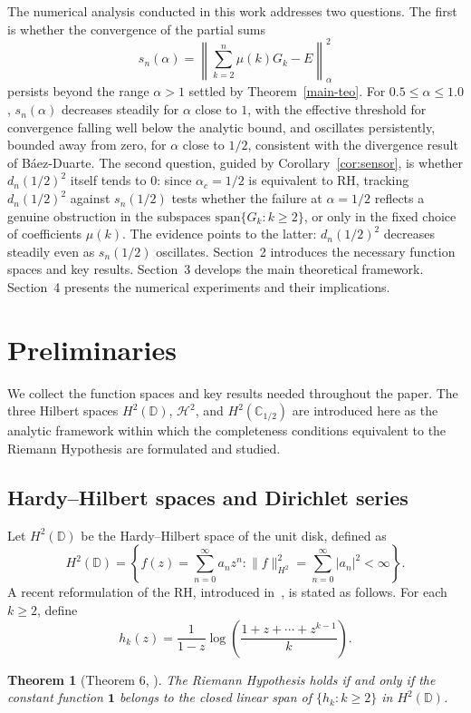 \documentclass[11pt]{extarticle}
\numberwithin{equation}{section}
\theoremstyle{plain}
\newtheorem{theorem}{Theorem}[section]
\theoremstyle{definition}
\begin{document}
The numerical analysis conducted in this work addresses two questions. The
first is whether the convergence of the partial sums
\[
s_n(\alpha) = \left\|\sum_{k=2}^{n}\mu(k)G_k - E\right\|^2_\alpha
\]
persists beyond the range $\alpha > 1$ settled by Theorem~\ref{main-teo}. For
$0.5 \leq \alpha \leq 1.0$, $s_n(\alpha)$ decreases steadily for $\alpha$ close
to $1$, with the effective threshold for convergence falling well below the
analytic bound, and oscillates persistently, bounded away from zero, for
$\alpha$ close to $1/2$, consistent with the divergence result of Báez-Duarte.
The second question, guided by Corollary~\ref{cor:sensor}, is whether
$d_n(1/2)^2$ itself tends to $0$: since $\alpha_c = 1/2$ is equivalent to RH,
tracking $d_n(1/2)^2$ against $s_n(1/2)$ tests whether the failure at
$\alpha = 1/2$ reflects a genuine obstruction in the subspaces
$\mathrm{span}\{G_k : k \geq 2\}$, or only in the fixed choice of coefficients
$\mu(k)$. The evidence points to the latter: $d_n(1/2)^2$ decreases steadily
even as $s_n(1/2)$ oscillates. Section~2
introduces the necessary function spaces and key results. Section~3 develops the main theoretical framework. Section~4
presents the numerical experiments and their implications.

\section{Preliminaries}

We collect the function spaces and key results needed throughout the paper. The three Hilbert spaces $H^2(\mathbb{D})$, $\mathcal{H}^2$, and $H^2(\mathbb{C}_{1/2})$ are introduced here as the analytic framework within which the completeness conditions equivalent to the Riemann Hypothesis are formulated and studied.

\subsection{Hardy--Hilbert spaces and Dirichlet series}

Let $H^2(\mathbb{D})$ be the Hardy--Hilbert space of the unit disk, defined as
\[
H^2(\mathbb{D}) = \left\{ f(z) = \sum_{n=0}^{\infty} a_n z^n : \|f\|_{H^2}^2 = \sum_{n=0}^{\infty} |a_n|^2 < \infty \right\}.
\]
A recent reformulation of the RH, introduced in~\cite{waleed1}, is stated as follows. For each $k \geq 2$, define
\[
h_k(z) = \frac{1}{1-z} \log\!\left(\frac{1 + z + \cdots + z^{k-1}}{k}\right).
\]

\begin{theorem}[Theorem 6, \cite{waleed1}]
The Riemann Hypothesis holds if and only if the constant function $\mathbf{1}$ belongs to the closed linear span of $\{h_k : k \geq 2\}$ in $H^2(\mathbb{D})$.
\end{theorem}
\end{document}
